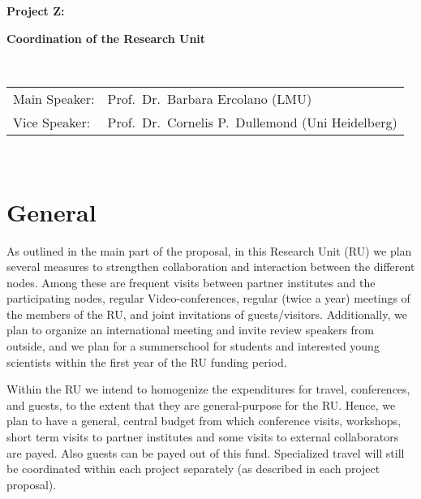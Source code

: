\documentclass[10pt,fleqn,twoside]{article}
\begin{document}
\newpage


\setcounter{page}{1}

\centerline{\huge\bf\Tcol
%
%
%
%
%
 Project Z:}
\vspace{1em}

\centerline{\LARGE\bf\Tcol Coordination of the Research Unit}

%
%
%
%
%
\vskip1.0cm


\\
\begin{tabular}{ll}
{\textsf{Main Speaker:}}   & Prof.\ Dr.\ Barbara Ercolano (LMU)\\
{\textsf{Vice Speaker:}}   & Prof.\ Dr.\ Cornelis P.~Dullemond (Uni Heidelberg)
\end{tabular}


\vspace{1em}
 \\


\section{General}
%
As outlined in the main part of the proposal, in this Research Unit (RU) we
plan several measures to strengthen collaboration and interaction between
the different nodes.  Among these are frequent visits between partner
institutes and the participating nodes, regular Video-conferences, regular
(twice a year) meetings of the members of the RU, and joint invitations of
guests/visitors. Additionally, we plan to organize an international meeting
and invite review speakers from outside, and we plan for a summerschool for
students and interested young scientists within the first year of the RU
funding period.

Within the RU we intend to homogenize the expenditures for travel,
conferences, and guests, to the extent that they are general-purpose for the
RU. Hence, we plan to have a general, central budget from which conference
visits, workshops, short term visits to partner institutes and some visits
to external collaborators are payed. Also guests can be payed out of this
fund. Specialized travel will still be coordinated within each project
separately (as described in each project proposal).
\end{document}
